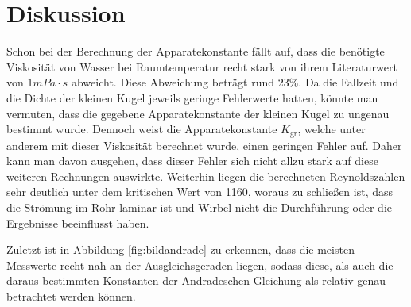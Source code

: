 \section{Diskussion}
Schon bei der Berechnung der Apparatekonstante fällt auf, dass die benötigte Viskosität von Wasser bei Raumtemperatur recht stark von ihrem Literaturwert von $1 mPa \cdot s$ abweicht. Diese Abweichung beträgt rund 23\%.
Da die Fallzeit und die Dichte der kleinen Kugel jeweils geringe Fehlerwerte hatten, könnte man vermuten, dass die gegebene Apparatekonstante der kleinen Kugel zu ungenau bestimmt wurde.
Dennoch weist die Apparatekonstante $K_{\text{gr}}$, welche unter anderem mit dieser Viskosität berechnet wurde, einen geringen Fehler auf. Daher kann man davon ausgehen, dass dieser Fehler sich nicht allzu stark auf diese
weiteren Rechnungen auswirkte. 
Weiterhin liegen die berechneten Reynoldszahlen sehr deutlich unter dem kritischen Wert von 1160, woraus zu schließen ist, dass die Strömung im Rohr laminar ist und Wirbel nicht die Durchführung oder die Ergebnisse beeinflusst 
haben.

Zuletzt ist in Abbildung \eqref{fig:bildandrade} zu erkennen, dass die meisten Messwerte recht nah an der Ausgleichsgeraden liegen, sodass diese, als auch die daraus bestimmten Konstanten der Andradeschen Gleichung als 
relativ genau betrachtet werden können. 